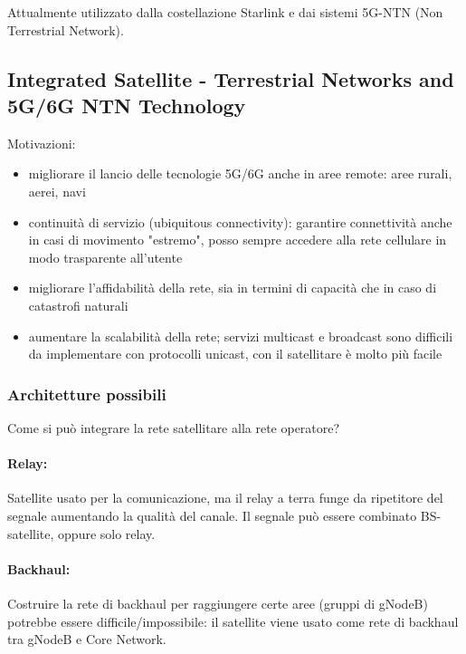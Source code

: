 Attualmente utilizzato dalla costellazione Starlink e dai sistemi 5G-NTN (Non Terrestrial Network).

\subsection{Integrated Satellite - Terrestrial Networks and 5G/6G NTN Technology}

Motivazioni: 
\begin{itemize}
	\item migliorare il lancio delle tecnologie 5G/6G anche in aree remote: aree rurali, aerei, navi

	\item continuità di servizio (ubiquitous connectivity): garantire connettività anche in casi di movimento "estremo", posso sempre accedere alla rete cellulare in modo trasparente all'utente

	\item migliorare l'affidabilità della rete, sia in termini di capacità che in caso di catastrofi naturali

	\item aumentare la scalabilità della rete; servizi multicast e broadcast sono difficili da implementare con protocolli unicast, con il satellitare è molto più facile
\end{itemize}

\subsubsection{Architetture possibili}

Come si può integrare la rete satellitare alla rete operatore?

\paragraph{Relay:} Satellite usato per la comunicazione, ma il relay a terra funge da ripetitore del segnale aumentando la qualità del canale. Il segnale può essere combinato BS-satellite, oppure solo relay.

\paragraph{Backhaul:} Costruire la rete di backhaul per raggiungere certe aree (gruppi di gNodeB) potrebbe essere difficile/impossibile: il satellite viene usato come rete di backhaul tra gNodeB e Core Network.

